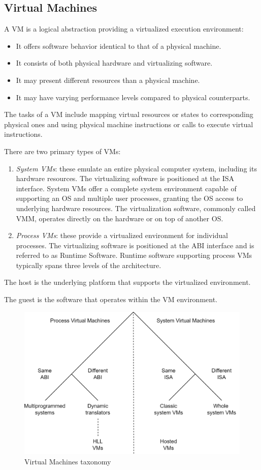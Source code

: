 \subsection{Virtual Machines}
A VM is a logical abstraction providing a virtualized execution environment:
\begin{itemize}
    \item It offers software behavior identical to that of a physical machine.
    \item It consists of both physical hardware and virtualizing software.
    \item It may present different resources than a physical machine.
    \item It may have varying performance levels compared to physical counterparts.
\end{itemize}
The tasks of a VM include mapping virtual resources or states to corresponding physical ones and using physical machine instructions or calls to execute virtual instructions.

There are two primary types of VMs:
\begin{enumerate}
    \item \textit{System VMs}: these emulate an entire physical computer system, including its hardware resources.
        The virtualizing software is positioned at the ISA interface.
        System VMs offer a complete system environment capable of supporting an OS and multiple user processes, granting the OS access to underlying hardware resources.
        The virtualization software, commonly called VMM, operates directly on the hardware or on top of another OS.
    \item \textit{Process VMs}: these provide a virtualized environment for individual processes.
        The virtualizing software is positioned at the ABI interface and is referred to as Runtime Software.
        Runtime software supporting process VMs typically spans three levels of the architecture.
\end{enumerate}
\begin{definition}
    The host is the underlying platform that supports the virtualized environment.
\end{definition}
\begin{definition}
    The guest is the software that operates within the VM environment.
\end{definition}
\begin{figure}[H]
    \centering
    \includegraphics[width=0.5\linewidth]{images/vtyp.png}
    \caption{Virtual Machines taxonomy}
\end{figure}

